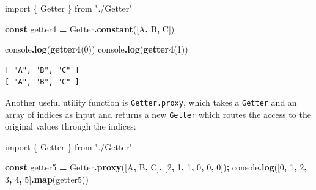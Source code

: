 \documentclass[
  openany]{book}
\newenvironment{Shaded}{\begin{snugshade}}{\end{snugshade}}
\newcommand{\BuiltInTok}[1]{#1}
\newcommand{\DecValTok}[1]{\textcolor[rgb]{0.00,0.00,0.81}{#1}}
\newcommand{\FunctionTok}[1]{\textcolor[rgb]{0.13,0.29,0.53}{\textbf{#1}}}
\newcommand{\ImportTok}[1]{#1}
\newcommand{\KeywordTok}[1]{\textcolor[rgb]{0.13,0.29,0.53}{\textbf{#1}}}
\newcommand{\NormalTok}[1]{#1}
\newcommand{\OperatorTok}[1]{\textcolor[rgb]{0.81,0.36,0.00}{\textbf{#1}}}
\newcommand{\StringTok}[1]{\textcolor[rgb]{0.31,0.60,0.02}{#1}}
\newcommand{\VerbatimStringTok}[1]{\textcolor[rgb]{0.31,0.60,0.02}{#1}}
\theoremstyle{definition}
\theoremstyle{definition}
\theoremstyle{definition}
\theoremstyle{definition}
\theoremstyle{remark}
\begin{document}
\begin{Shaded}
\begin{Highlighting}[]
\ImportTok{import}\NormalTok{ \{ Getter \} }\ImportTok{from} \StringTok{"./Getter"}

\KeywordTok{const}\NormalTok{ getter4 }\OperatorTok{=}\NormalTok{ Getter}\OperatorTok{.}\FunctionTok{constant}\NormalTok{([}\VerbatimStringTok{\textasciigrave{}A\textasciigrave{}}\OperatorTok{,} \VerbatimStringTok{\textasciigrave{}B\textasciigrave{}}\OperatorTok{,} \VerbatimStringTok{\textasciigrave{}C\textasciigrave{}}\NormalTok{])}

\BuiltInTok{console}\OperatorTok{.}\FunctionTok{log}\NormalTok{(}\FunctionTok{getter4}\NormalTok{(}\DecValTok{0}\NormalTok{))}
\BuiltInTok{console}\OperatorTok{.}\FunctionTok{log}\NormalTok{(}\FunctionTok{getter4}\NormalTok{(}\DecValTok{1}\NormalTok{))}
\end{Highlighting}
\end{Shaded}

\begin{verbatim}
[ "A", "B", "C" ]
[ "A", "B", "C" ]
\end{verbatim}

Another useful utility function is \texttt{Getter.proxy}, which takes a \texttt{Getter} and an array of indices as input and returns a new \texttt{Getter} which routes the access to the original values through the indices:

\begin{Shaded}
\begin{Highlighting}[]
\ImportTok{import}\NormalTok{ \{ Getter \} }\ImportTok{from} \StringTok{"./Getter"}

\KeywordTok{const}\NormalTok{ getter5 }\OperatorTok{=}\NormalTok{ Getter}\OperatorTok{.}\FunctionTok{proxy}\NormalTok{([}\VerbatimStringTok{\textasciigrave{}A\textasciigrave{}}\OperatorTok{,} \VerbatimStringTok{\textasciigrave{}B\textasciigrave{}}\OperatorTok{,} \VerbatimStringTok{\textasciigrave{}C\textasciigrave{}}\NormalTok{]}\OperatorTok{,}\NormalTok{ [}\DecValTok{2}\OperatorTok{,} \DecValTok{1}\OperatorTok{,} \DecValTok{1}\OperatorTok{,} \DecValTok{0}\OperatorTok{,} \DecValTok{0}\OperatorTok{,} \DecValTok{0}\NormalTok{])}\OperatorTok{;}
\BuiltInTok{console}\OperatorTok{.}\FunctionTok{log}\NormalTok{([}\DecValTok{0}\OperatorTok{,} \DecValTok{1}\OperatorTok{,} \DecValTok{2}\OperatorTok{,} \DecValTok{3}\OperatorTok{,} \DecValTok{4}\OperatorTok{,} \DecValTok{5}\NormalTok{]}\OperatorTok{.}\FunctionTok{map}\NormalTok{(getter5))}
\end{Highlighting}
\end{Shaded}
\end{document}
